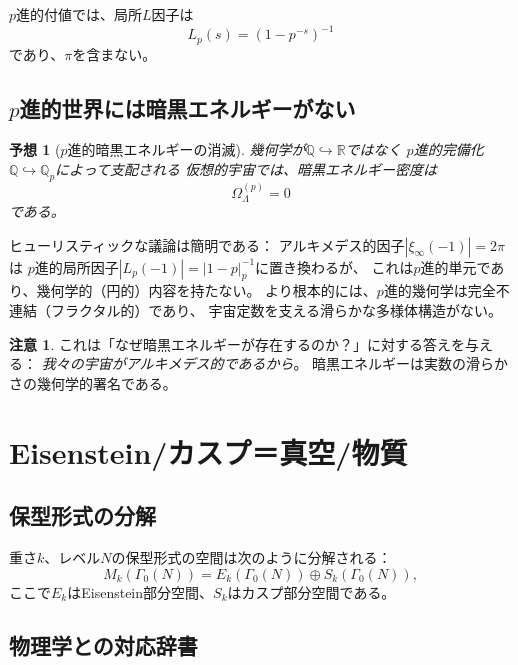 \documentclass[12pt,a4paper]{article}
\newtheorem{conjecture}[theorem]{予想}
\theoremstyle{definition}
\newtheorem{remark}[theorem]{注意}
\newcommand{\Q}{\mathbb{Q}}
\newcommand{\R}{\mathbb{R}}
\newcommand{\Qp}{\mathbb{Q}_p}
\newcommand{\OmL}{\Omega_\Lambda}
\begin{document}
$p$進的付値では、局所$L$因子は
\begin{equation}
  L_p(s) = (1-p^{-s})^{-1}
\end{equation}
であり、$\pi$を含まない。

\subsection{$p$進的世界には暗黒エネルギーがない}

\begin{conjecture}[$p$進的暗黒エネルギーの消滅]
幾何学が$\Q\hookrightarrow\R$ではなく
$p$進的完備化$\Q\hookrightarrow\Qp$によって支配される
仮想的宇宙では、暗黒エネルギー密度は
\[
  \OmL^{(p)} = 0
\]
である。
\end{conjecture}

ヒューリスティックな議論は簡明である：
アルキメデス的因子$|\xi_\infty(-1)|=2\pi$は
$p$進的局所因子$|L_p(-1)|=|1-p|_p^{-1}$に置き換わるが、
これは$p$進的単元であり、幾何学的（円的）内容を持たない。
より根本的には、$p$進的幾何学は完全不連結（フラクタル的）であり、
宇宙定数を支える滑らかな多様体構造がない。

\begin{remark}
これは「なぜ暗黒エネルギーが存在するのか？」に対する答えを与える：
\emph{我々の宇宙がアルキメデス的であるから}。
暗黒エネルギーは実数の滑らかさの幾何学的署名である。
\end{remark}

\section{Eisenstein/カスプ＝真空/物質}\label{sec:eisenstein_cusp}

\subsection{保型形式の分解}

重さ$k$、レベル$N$の保型形式の空間は次のように分解される：
\begin{equation}
  M_k(\Gamma_0(N)) = E_k(\Gamma_0(N)) \oplus S_k(\Gamma_0(N)),
\end{equation}
ここで$E_k$はEisenstein部分空間、$S_k$はカスプ部分空間である。

\subsection{物理学との対応辞書}
\end{document}
